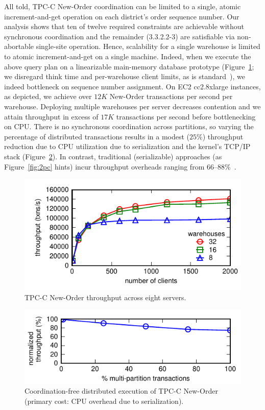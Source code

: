 All told, TPC-C New-Order coordination can be limited to a single,
atomic increment-and-get operation on each district's order sequence
number. Our \cfreedom analysis shows that ten of twelve required
constraints are achievable without synchronous coordination and the
remainder (3.3.2.2-3) are satisfiable via non-abortable single-site
operation. Hence, scalability for a single warehouse is limited to
atomic increment-and-get on a single machine. Indeed, when we execute
the above query plan on a linearizable main-memory database prototype
(Figure~\ref{fig:clients}; we disregard think time and per-warehouse
client limits, as is
standard~\cite{calvin,hstore,abadi-vll,jones-dtxn}), we indeed
bottleneck on sequence number assignment. On EC2 cc2.8xlarge
instances, as depicted, we achieve over $12K$ New-Order transactions
per second per warehouse. Deploying multiple warehouses per server
decreases contention and we attain throughput in excess of $17K$
transactions per second before bottlenecking on CPU. There is no
synchronous coordination across partitions, so varying the percentage
of distributed transactions results in a modest ($25\%$) throughput
reduction due to CPU utilization due to serialization and the kernel's
TCP/IP stack (Figure~\ref{fig:pct}). In contrast, traditional
(serializable) approaches (as Figure~\ref{fig:2pc} hints) incur
throughput overheads ranging from 66--88\%~\cite{abadi-vll}.

\begin{figure}
\includegraphics[width=\columnwidth]{figs/wh_thru.pdf}\vspace{-1em}
\caption{TPC-C New-Order throughput across eight servers.}
\label{fig:clients}
\end{figure}

\begin{figure}
\includegraphics[width=\columnwidth]{figs/pct_thru.pdf}\vspace{-1em}
\caption{Coordination-free distributed execution of TPC-C New-Order
  (primary cost: CPU overhead due to serialization).}
\label{fig:pct}
\end{figure}

